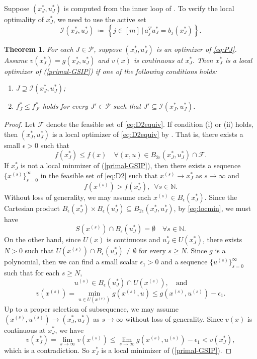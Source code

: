 \documentclass{amsart}
\newcommand{\reff}[1]{(\ref{#1})}
\newtheorem{theorem}{Theorem}[section]
\theoremstyle{plain}
\newcommand{\N}{\mathbb{N}}
\newcommand{\mc}[1]{\mathcal{#1}}
\numberwithin{equation}{section}
\begin{document}
		Suppose $(x_J^*, u_J^*)$ is computed from the inner loop of . 
		To verify the local optimality of $x_J^*$, we need to use the active set
		\begin{equation}\label{eq:Aset}
			\mc{I}(x_J^*,u_J^*) \,\coloneqq\,\left\{j\in[m]\,\vert\, a_j^Tu_J^* = b_j(x_J^*) \right\}.
		\end{equation}
		\begin{theorem}\label{thm:locmin}
			For each $J\in \mc{P}$, suppose $(x_J^*,u_J^*)$ is an optimizer of \eqref{eq:PJ}.
			Assume $v(x_J^*) = g(x_J^*,u_J^*)$ and $v(x)$ is continuous at $x_J^*$.
			Then $x_J^*$ is a local optimizer of \reff{primal-GSIP} if one of the following conditions holds:
			\begin{enumerate}
				\item[(i)] $J\supseteq \mc{I}(x_J^*,u_J^*)$;
				\item[(ii)] $f_J^*\le f_{J'}^*$ holds for every $J'\in \mc{P}$ such that $J'\subseteq \mc{I}(x_J^*,u_J^*)$. 
			\end{enumerate}
		\end{theorem}
		\begin{proof}
			Let $\mc{F}$ denote the feasible set of \eqref{eq:D2equiv}.
			If condition (i) or (ii) holds, then $(x_J^*,u_J^*)$ is a local optimizer of
			 \eqref{eq:D2equiv} by \cite[Theorem~3.1]{nie2023plmes}.
			That is, there exists a small $\epsilon>0$ such that 
			\begin{equation}\label{eq:locmin}
				f(x_J^*)\le f(x)\quad \forall (x,u)\in B_{2\epsilon}(x_J^*, u_J^*)\cap\mc{F}.  
			\end{equation}
			If $x_J^*$ is not a local minmizer of \reff{primal-GSIP},
			then there exists a sequence $\{x^{(s)}\}_{s=0}^{\infty}$ in the feasible set 
			of \eqref{eq:D2} such that $x^{(s)}\to x_J^*$ as $s\to \infty$ and 
			\[
			f(x^{(s)})>f(x_J^*),\,\,\,\forall s\in \N.
			\]
			Without loss of generality, we may assume each $x^{(s)}\in B_{\epsilon}(x_J^*)$.
			Since the Cartesian product $B_{\epsilon}(x_J^*)\times B_{\epsilon} (u_J^*)\subseteq B_{2\epsilon}(x_J^*,u_J^*)$, by \eqref{eq:locmin}, we must have
			\[
			S(x^{(s)})\cap B_{\epsilon}(u_J^*)=\emptyset\quad \forall s\in\N.
			\]
			On the other hand, since $U(x)$ is continuous and $u_J^*\in U(x_J^*)$,
			there exists $N>0$ such that
			$U(x^{(s)})\cap B_{\epsilon}(u_J^*)\neq \emptyset$ for every $s\ge N$.
			Since $g$ is a polynomial, then we can find a small scalar $\epsilon_1>0$ and a sequence $\{u^{(s)}\}_{s=0}^{\infty}$ such that for each $s\ge N$,
			\[ u^{(s)}\in B_{\epsilon}(u_J^*)\cap U(x^{(s)}),\quad \mbox{and}\]
			\[
			v(x^{(s)}) = \min\limits_{u\in U(x^{(s)})} g(x^{(s)},u)\le 
			g(x^{(s)}, u^{(s)})-\epsilon_1.
			\]
			Up to a proper selection of subsequence, we may assume
			$(x^{(s)}, u^{(s)}) \to  (x_J^*, u_J^*)$ as $s\to \infty$ without loss of generality.
			Since $v(x)$ is continuous at $x_J^*$, we have
			\[ 
			v(x_J^*) = \lim_{s\to \infty} v(x^{(s)})\le \lim_{s\to \infty} g(x^{(s)},u^{(s)})-\epsilon_1 < v(x_J^*), \]
			which is a contradiction. 
			So $x_J^*$ is a local minimizer of \reff{primal-GSIP}.
		\end{proof}
		
\end{document}
